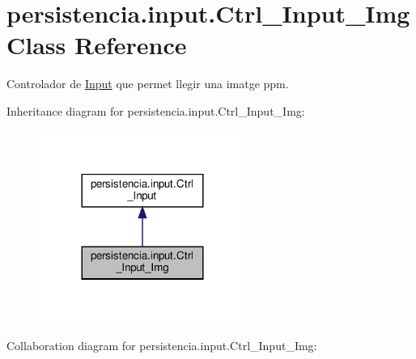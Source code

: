 \hypertarget{classpersistencia_1_1input_1_1Ctrl__Input__Img}{}\section{persistencia.\+input.\+Ctrl\+\_\+\+Input\+\_\+\+Img Class Reference}
\label{classpersistencia_1_1input_1_1Ctrl__Input__Img}


Controlador de \hyperlink{classpersistencia_1_1input_1_1Input}{Input} que permet llegir una imatge ppm.  




Inheritance diagram for persistencia.\+input.\+Ctrl\+\_\+\+Input\+\_\+\+Img\+:\nopagebreak
\begin{figure}[H]
\begin{center}
\leavevmode
\includegraphics[width=192pt]{classpersistencia_1_1input_1_1Ctrl__Input__Img__inherit__graph}
\end{center}
\end{figure}


Collaboration diagram for persistencia.\+input.\+Ctrl\+\_\+\+Input\+\_\+\+Img\+:

